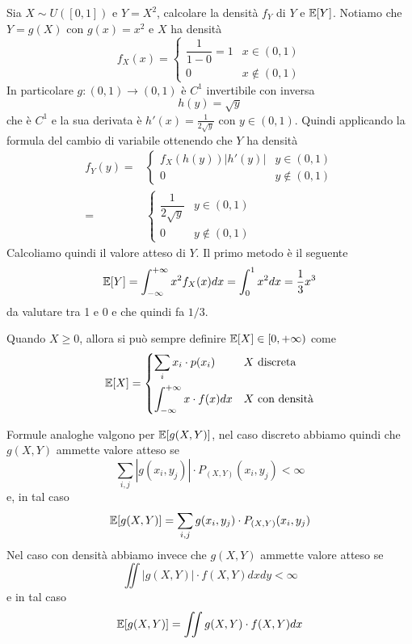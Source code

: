\begin{example}
	Sia $X \sim U([0,1])$ e $Y = X^2$, calcolare la densità $f_Y$ di $Y$ e $\mathbb{E}[Y]$. Notiamo che
	$Y = g(X)$ con $g(x) = x^2$ e $X$ ha densità
	\[
		f_X(x) = \begin{cases}
			\dfrac{1}{1-0} = 1 & x \in (0,1)    \\
			0                  & x \notin (0,1)
		\end{cases}
	\]
	In particolare $g : (0,1) \to (0,1)$ è $C^1$ invertibile con inversa
	\[ h(y) = \sqrt{y} \]
	che è $C^1$ e la sua derivata è $h'(x) = \frac{1}{2 \sqrt{y}}$ con $y \in (0,1)$. Quindi
	applicando la formula del cambio di variabile ottenendo che $Y$ ha densità
	\begin{align*}
		f_Y (y) = & \begin{cases}
			            f_X (h(y)) |h'(y)| & y \in (0,1)    \\
			            0                  & y \notin (0,1)
		            \end{cases}                  \\
		=         & \begin{cases}
			            \dfrac{1}{2 \sqrt{y}} & y \in (0,1)    \\
			            0                     & y \notin (0,1)
		            \end{cases}
	\end{align*}
	Calcoliamo quindi il valore atteso di $Y$. Il primo metodo è il seguente
	\[ \mathbb{E}[Y] = \int_{-\infty}^{+\infty} x^2 f_X (x) dx = \int_0^1 x^2 dx = \frac{1}{3} x^3 \]
	da valutare tra 1 e 0 e che quindi fa $1/3$.
\end{example}

\begin{observation}
	Quando $X \geq 0$, allora si può sempre definire $\mathbb{E}[X] \in [0, +\infty)$ come
	\[
		\mathbb{E}[X] = \begin{cases}
			\displaystyle\sum_i x_i \cdot p(x_i)                  & X \text{ discreta}    \\[3ex]
			\displaystyle\int_{-\infty}^{+\infty} x \cdot f(x) dx & X \text{ con densità}
		\end{cases}
	\]
\end{observation}

\begin{observation}
	Formule analoghe valgono per $\mathbb{E}[g(X,Y)]$, nel caso discreto abbiamo quindi che $g(X, Y)$
	ammette valore atteso se
	\[ \sum_{i,j} |g(x_i, y_j)| \cdot P_{(X,Y)} (x_i, y_j) < \infty \]
	e, in tal caso
	\[ \mathbb{E}[g(X,Y)] = \sum_{i,j} g(x_i, y_j) \cdot P_{(X,Y)} (x_i, y_j) \]
	Nel caso con densità abbiamo invece che $g(X,Y)$ ammette valore atteso se
	\[ \iint |g(X,Y)| \cdot f (X,Y) dx dy < \infty \]
	e in tal caso
	\[ \mathbb{E}[g(X, Y)] = \iint g(X, Y) \cdot f(X,Y) dx \]
\end{observation}

